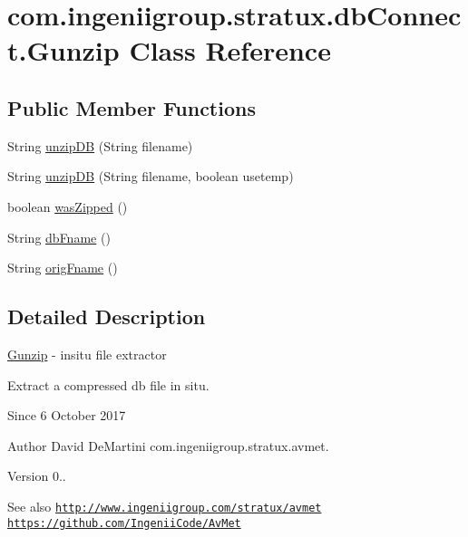 \hypertarget{classcom_1_1ingeniigroup_1_1stratux_1_1db_connect_1_1_gunzip}{}\section{com.\+ingeniigroup.\+stratux.\+db\+Connect.\+Gunzip Class Reference}
\label{classcom_1_1ingeniigroup_1_1stratux_1_1db_connect_1_1_gunzip}
\subsection*{Public Member Functions}
\begin{DoxyCompactItemize}
\item 
String \hyperlink{classcom_1_1ingeniigroup_1_1stratux_1_1db_connect_1_1_gunzip_afb23ce108ac9e6bfd5baecc075242b52}{unzip\+DB} (String filename)
\item 
String \hyperlink{classcom_1_1ingeniigroup_1_1stratux_1_1db_connect_1_1_gunzip_ae4a1ac5d39f6b6f3794696151cffdf9a}{unzip\+DB} (String filename, boolean usetemp)
\item 
boolean \hyperlink{classcom_1_1ingeniigroup_1_1stratux_1_1db_connect_1_1_gunzip_af2eadfecb457ab5f04cb079f17dc7ead}{was\+Zipped} ()
\item 
String \hyperlink{classcom_1_1ingeniigroup_1_1stratux_1_1db_connect_1_1_gunzip_a5d217a9ae9551576a3585202be2b94cd}{db\+Fname} ()
\item 
String \hyperlink{classcom_1_1ingeniigroup_1_1stratux_1_1db_connect_1_1_gunzip_a0f6895982a6fe7df3784521ac3fd843f}{orig\+Fname} ()
\end{DoxyCompactItemize}


\subsection{Detailed Description}
\hyperlink{classcom_1_1ingeniigroup_1_1stratux_1_1db_connect_1_1_gunzip}{Gunzip} -\/ insitu file extractor

Extract a compressed db file in situ.

\begin{DoxySince}{Since}
6 October 2017 
\end{DoxySince}
\begin{DoxyAuthor}{Author}
David De\+Martini  com.\+ingeniigroup.\+stratux.\+avmet. 
\end{DoxyAuthor}
\begin{DoxyVersion}{Version}
0.. 
\end{DoxyVersion}
\begin{DoxySeeAlso}{See also}
\href{http://www.ingeniigroup.com/stratux/avmet}{\tt http\+://www.\+ingeniigroup.\+com/stratux/avmet}  \href{https://github.com/IngeniiCode/AvMet}{\tt https\+://github.\+com/\+Ingenii\+Code/\+Av\+Met} 
\end{DoxySeeAlso}


